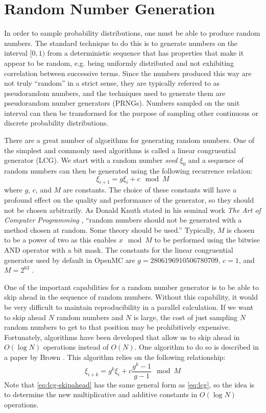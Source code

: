 \section{Random Number Generation}

In order to sample probability distributions, one must be able to produce random
numbers. The standard technique to do this is to generate numbers on the
interval $[0,1)$ from a deterministic sequence that has properties that make it
  appear to be random, e.g. being uniformly distributed and not exhibiting
  correlation between successive terms. Since the numbers produced this way are
  not truly ``random'' in a strict sense, they are typically referred to as
  pseudorandom numbers, and the techniques used to generate them are
  pseudorandom number generators (PRNGs). Numbers sampled on the unit interval
  can then be transformed for the purpose of sampling other continuous or
  discrete probability distributions.

There are a great number of algorithms for generating random numbers. One of the
simplest and commonly used algorithms is called a linear congruential generator
(LCG). We start with a random number \emph{seed} $\xi_0$ and a sequence of
random numbers can then be generated using the following recurrence relation:
\begin{equation}
  \label{eq:lcg}
  \xi_{i+1} = g \xi_i + c \mod M
\end{equation}
where $g$, $c$, and $M$ are constants. The choice of these constants will have a
profound effect on the quality and performance of the generator, so they should
not be chosen arbitrarily. As Donald Knuth stated in his seminal work \emph{The
  Art of Computer Programming} \cite{knuth-2006}, ``random numbers should not be
generated with a method chosen at random. Some theory should be used.''
Typically, $M$ is chosen to be a power of two as this enables $x \mod M$ to be
performed using the bitwise AND operator with a bit mask. The constants for the
linear congruential generator used by default in OpenMC are $g =
2806196910506780709$, $c = 1$, and $M = 2^{63}$ \cite{mathcomp-lecuyer-1999}.

One of the important capabilities for a random number generator is to be able to
skip ahead in the sequence of random numbers. Without this capability, it would
be very difficult to maintain reproducibility in a parallel calculation. If we
want to skip ahead $N$ random numbers and $N$ is large, the cost of just
sampling $N$ random numbers to get to that position may be prohibitively
expensive. Fortunately, algorithms have been developed that allow us to skip
ahead in $O(\log N)$ operations instead of $O(N)$. One algorithm to do so is
described in a paper by Brown \cite{trans-brown-1994}. This algorithm relies on
the following relationship:
\begin{equation}
  \label{eq:lcg-skipahead}
  \xi_{i+k} = g^k \xi_i + c \frac{g^k - 1}{g - 1} \mod M
\end{equation}
Note that \eqref{eq:lcg-skipahead} has the same general form as \eqref{eq:lcg},
so the idea is to determine the new multiplicative and additive constants in
$O(\log N)$ operations.


